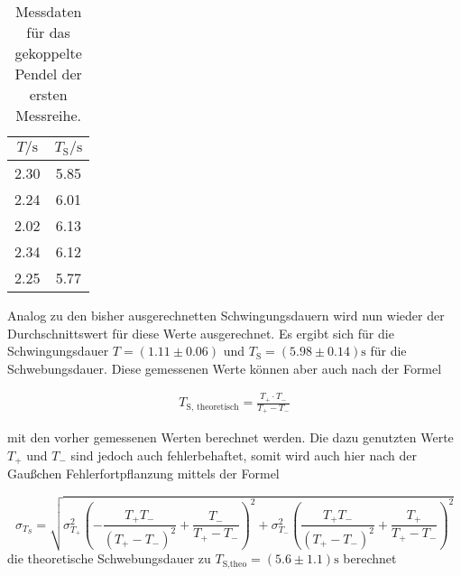             \begin{table}[ht]
                \centering
                \caption{Messdaten für das gekoppelte Pendel der ersten Messreihe.}
                \label{tab:gek1}
                \begin{tabular}{c c}
                 \toprule
                 $T / \si{\s}$ & $T_{\text{S}} / \si{\s}$\\
                 \midrule
                 2.30   & 5.85 \\
                 2.24   & 6.01 \\
                 2.02   & 6.13 \\
                 2.34   & 6.12 \\
                 2.25   & 5.77 \\
                 \bottomrule
                \end{tabular}
            \end{table}

            \noindent Analog zu den bisher ausgerechnetten Schwingungsdauern wird nun wieder der Durchschnittswert für diese Werte ausgerechnet.
            Es ergibt sich für die Schwingungsdauer $T = (1.11 \pm 0.06) $ und $T_{\text{S}} = (5.98 \pm 0.14) \si{\second}$ für die Schwebungsdauer.
            Diese gemessenen Werte können aber auch nach der Formel 

            \begin{align*}
                T_\text{S, theoretisch} = \frac{T_{+} \cdot T_{-}}{T_{+} - T_{-}}
            \end{align*}

            \noindent mit den vorher gemessenen Werten berechnet werden. Die dazu genutzten Werte $T_+$ und $T_-$ sind jedoch auch fehlerbehaftet, 
            somit wird auch hier nach der Gaußchen Fehlerfortpflanzung mittels der Formel 

            \begin{equation*}
                \sigma_{T_S} = \sqrt{\sigma_{T_{+}}^{2} \left(- \frac{T_{+} T_{-}}{\left(T_{+} - T_{-}\right)^{2}} + \frac{T_{-}}{T_{+} - T_{-}}\right)^{2} + \sigma_{T_{-}}^{2} \left(\frac{T_{+} T_{-}}{\left(T_{+} - T_{-}\right)^{2}} + \frac{T_{+}}{T_{+} - T_{-}}\right)^{2}}
            \end{equation*}
            die theoretische Schwebungsdauer zu $T_{\text{S,theo}} = (5.6 \pm 1.1) \si{\second}$ berechnet
            \noindent 

